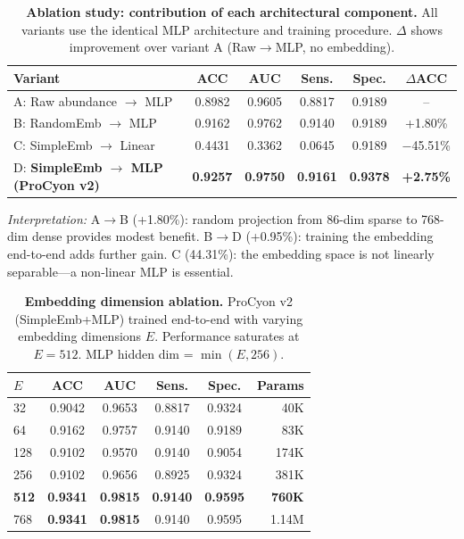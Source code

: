 \documentclass[11pt,a4paper]{article}
\begin{document}
\begin{table}[ht]
\centering
\caption{\textbf{Ablation study: contribution of each architectural component.}
All variants use the identical MLP architecture and training procedure.
$\Delta$ shows improvement over variant A (Raw$\rightarrow$MLP, no embedding).}
\label{tab:ablation}
\begin{tabular}{lccccc}
\toprule
\textbf{Variant} & \textbf{ACC} & \textbf{AUC} & \textbf{Sens.} & \textbf{Spec.} & \textbf{$\Delta$ACC} \\
\midrule
A: Raw abundance $\rightarrow$ MLP & 0.8982 & 0.9605 & 0.8817 & 0.9189 & -- \\
B: RandomEmb $\rightarrow$ MLP & 0.9162 & 0.9762 & 0.9140 & 0.9189 & +1.80\% \\
C: SimpleEmb $\rightarrow$ Linear & 0.4431 & 0.3362 & 0.0645 & 0.9189 & $-$45.51\% \\
D: \textbf{SimpleEmb $\rightarrow$ MLP (ProCyon v2)} & \textbf{0.9257} & \textbf{0.9750} & \textbf{0.9161} & \textbf{0.9378} & \textbf{+2.75\%} \\
\bottomrule
\end{tabular}

\vspace{4pt}
\textit{Interpretation:} A$\rightarrow$B (+1.80\%): random projection from 86-dim sparse to 768-dim dense provides modest benefit.
B$\rightarrow$D (+0.95\%): training the embedding end-to-end adds further gain.
C (44.31\%): the embedding space is not linearly separable---a non-linear MLP is essential.
\end{table}

\begin{table}[ht]
\centering
\caption{\textbf{Embedding dimension ablation.}
ProCyon v2 (SimpleEmb+MLP) trained end-to-end with varying embedding dimensions $E$.
Performance saturates at $E=512$. MLP hidden dim = $\min(E, 256)$.}
\label{tab:embedding_dim}
\begin{tabular}{lccccr}
\toprule
\textbf{$E$} & \textbf{ACC} & \textbf{AUC} & \textbf{Sens.} & \textbf{Spec.} & \textbf{Params} \\
\midrule
32  & 0.9042 & 0.9653 & 0.8817 & 0.9324 & 40K \\
64  & 0.9162 & 0.9757 & 0.9140 & 0.9189 & 83K \\
128 & 0.9102 & 0.9570 & 0.9140 & 0.9054 & 174K \\
256 & 0.9102 & 0.9656 & 0.8925 & 0.9324 & 381K \\
\textbf{512} & \textbf{0.9341} & \textbf{0.9815} & \textbf{0.9140} & \textbf{0.9595} & \textbf{760K} \\
768 & \textbf{0.9341} & \textbf{0.9815} & 0.9140 & 0.9595 & 1.14M \\
\bottomrule
\end{tabular}
\end{table}
\end{document}
